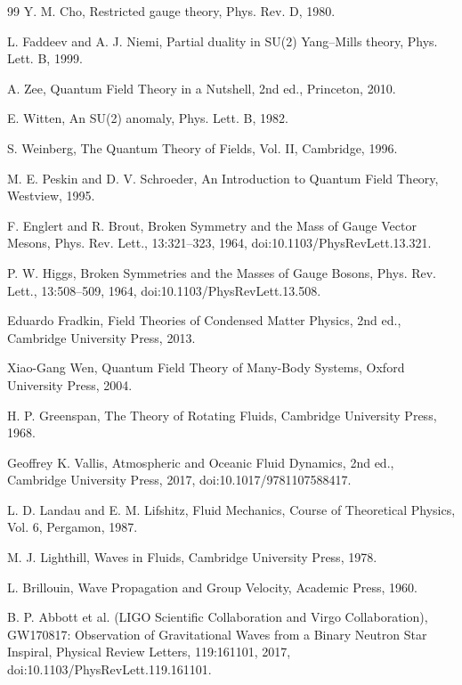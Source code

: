 \begin{thebibliography}{99}
     Y. M. Cho, Restricted gauge theory, Phys. Rev. D, 1980.

     L. Faddeev and A. J. Niemi, Partial duality in SU(2) Yang–Mills theory, Phys. Lett. B, 1999.

     A. Zee, Quantum Field Theory in a Nutshell, 2nd ed., Princeton, 2010.

     E. Witten, An SU(2) anomaly, Phys. Lett. B, 1982.

     S. Weinberg, The Quantum Theory of Fields, Vol. II, Cambridge, 1996.

     M. E. Peskin and D. V. Schroeder, An Introduction to Quantum Field Theory, Westview, 1995.

     F. Englert and R. Brout, Broken Symmetry and the Mass of Gauge Vector Mesons, Phys. Rev. Lett., 13:321--323, 1964, doi:10.1103/PhysRevLett.13.321.

     P. W. Higgs, Broken Symmetries and the Masses of Gauge Bosons, Phys. Rev. Lett., 13:508--509, 1964, doi:10.1103/PhysRevLett.13.508.

     Eduardo Fradkin, Field Theories of Condensed Matter Physics, 2nd ed., Cambridge University Press, 2013.

     Xiao-Gang Wen, Quantum Field Theory of Many-Body Systems, Oxford University Press, 2004.

     H. P. Greenspan, The Theory of Rotating Fluids, Cambridge University Press, 1968.

     Geoffrey K. Vallis, Atmospheric and Oceanic Fluid Dynamics, 2nd ed., Cambridge University Press, 2017, doi:10.1017/9781107588417.

     L. D. Landau and E. M. Lifshitz, Fluid Mechanics, Course of Theoretical Physics, Vol. 6, Pergamon, 1987.

     M. J. Lighthill, Waves in Fluids, Cambridge University Press, 1978.

     L. Brillouin, Wave Propagation and Group Velocity, Academic Press, 1960.

     B. P. Abbott et al. (LIGO Scientific Collaboration and Virgo Collaboration), GW170817: Observation of Gravitational Waves from a Binary Neutron Star Inspiral, Physical Review Letters, 119:161101, 2017, doi:10.1103/PhysRevLett.119.161101.


\end{thebibliography}

